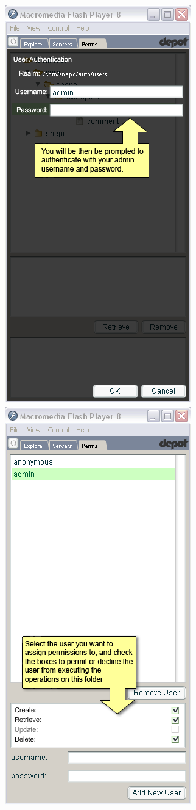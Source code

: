 \documentclass{report}
\begin{document}
\begin{center}
\includegraphics[scale=0.5]{users-images/Step9-annotated.png}
\includegraphics[scale=0.5]{users-images/Step10-annotated.png}
\end{center}
\end{document}
